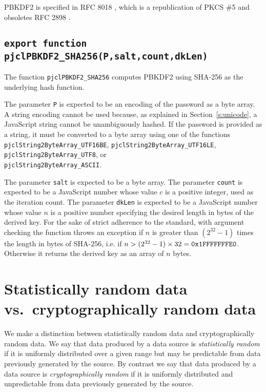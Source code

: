 \documentclass[12pt]{article}
\begin{document}
PBKDF2 is specified in RFC 8018 \cite{RFC8018}, which is a republication of
PKCS \#5 and obsoletes RFC 2898 \cite{RFC2898}.

\subsection{\tt export function pjclPBKDF2\_SHA256(P,salt,count,dkLen)}

The function {\tt pjclPBKDF2\_SHA256} computes PBKDF2 using SHA-256 as the
underlying hash function.  

The parameter {\tt P} is expected to be an encoding
of the password as a byte array.  A string encoding cannot be used because, as
explained in Section~\ref{s:unicode}, a JavaScript string cannot be unambiguously hashed.
If the password is provided as a string, it must be converted to a byte array 
using one of the functions
{\tt pjclString2ByteArray\_UTF16BE},
{\tt pjclString2ByteArray\_UTF16LE},
{\tt pjclString2ByteArray\_UTF8}, or\\
{\tt pjclString2ByteArray\_ASCII}.

The parameter {\tt salt} is expected to be a byte array.  The parameter
{\tt count} is expected to be a JavaScript number whose value $c$ is
a positive integer, used as the iteration count.  The parameter {\tt  dkLen}
is expected to be
a JavaScript number whose value $n$ is a positive number specifying the desired length
in bytes of the derived key.  For the sake of strict adherence to the standard,
with argument checking the function throws an exception if 
$n$ is greater than $(2^{32} - 1)$ times the length in bytes of SHA-256,
i.e. if $n > (2^{32} - 1)\times 32 = \mbox{\tt 0x1FFFFFFFE0}$. Otherwise
it returns the derived key as an array of $n$ bytes.

\section{Statistically random data vs.\ cryptographically random data}

We make a distinction between statistically random data and
cryptographically random data.  We say that data produced by a data
source is {\em statistically random\/} if it is uniformly distributed
over a given range but may be predictable from data previously
generated by the source.  By contrast we say that data produced by a
data source is {\em cryptographically random\/} if it is uniformly
distributed and unpredictable from data previously generated by the
source.
\end{document}
